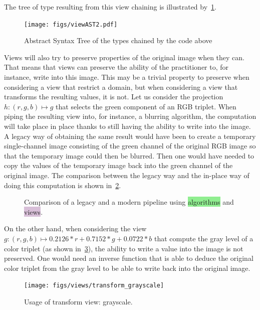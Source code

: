 \noindent The tree of type resulting from this view chaining is illustrated by~\cref{fig.viewAST}.

\begin{figure}[htb]
  \centering
  \texttt{[image: figs/viewAST2.pdf]}
  \caption{Abstract Syntax Tree of the types chained by the code above}
  \label{fig.viewAST}
\end{figure}

Views will also try to preserve properties of the original image when they can. That means that views can preserve the
ability of the practitioner to, for instance, write into this image. This may be a trivial property to preserve when
considering a view that restrict a domain, but when considering a view that transforms the resulting values, it is not.
Let us consider the projection $h: (r,g,b) \mapsto g$ that selects the green component of an RGB triplet. When piping
the resulting view into, for instance, a blurring algorithm, the computation will take place in place thanks to still
having the ability to write into the image. A legacy way of obtaining the same result would have been to create a
temporary single-channel image consisting of the green channel of the original RGB image so that the temporary image
could then be blurred. Then one would have needed to copy the values of the temporary image back into the green channel
of the original image. The comparison between the legacy way and the in-place way of doing this computation is shown
in~\cref{fig.legacy.vs.view}.

\begin{figure}[tbh]
  \centering
  \hfil

  \caption{Comparison of a legacy and a modern pipeline using \colorbox{lightgreen}{algorithms} and
    \colorbox{thistle}{views}.}
  \label{fig.legacy.vs.view}
\end{figure}

On the other hand, when considering the view $g: (r,g,b) \mapsto 0.2126*r+0.7152*g+0.0722*b$ that compute the gray level
of a color triplet (as shown in~\cref{fig.view.grayscale}), the ability to write a value into the image is not
preserved. One would need an inverse function that is able to deduce the original color triplet from the gray level to
be able to write back into the original image.

\begin{figure}[tbh]
  \centering
  \texttt{[image: figs/views/transform\_grayscale]}
  \caption{Usage of transform view: grayscale.}
  \label{fig.view.grayscale}
\end{figure}

